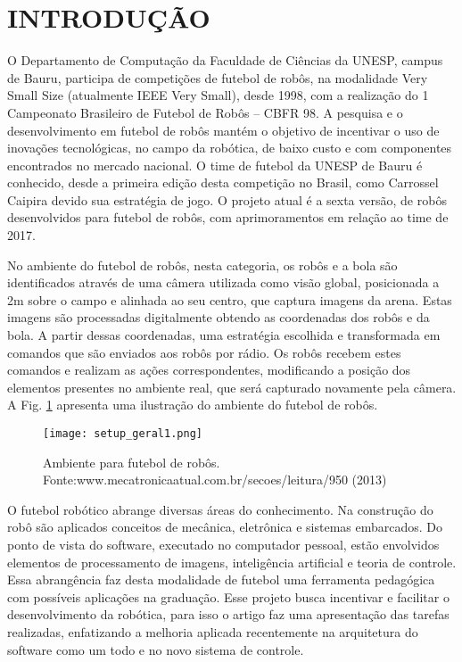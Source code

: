  \section{INTRODU{\c C}ÃO}

O Departamento de Computação da Faculdade de Ciências
da UNESP, campus de Bauru, participa de competições de
futebol de robôs, na modalidade Very Small Size (atualmente
IEEE Very Small), desde 1998, com a realização do 1\textordmasculine
Campeonato Brasileiro de Futebol de Robôs -- CBFR 98. A
pesquisa e o desenvolvimento em futebol de robôs mantém o objetivo de incentivar o uso de
inovações tecnológicas, no campo da robótica, de baixo custo e
com componentes encontrados no mercado nacional. O time de futebol da UNESP
de Bauru é conhecido, desde a primeira edição desta
competição no Brasil, como Carrossel Caipira devido sua
estratégia de jogo. O projeto atual é a sexta versão, de robôs
desenvolvidos para futebol de robôs, com aprimoramentos em
relação ao time de 2017.

No ambiente do futebol de robôs, nesta categoria, os robôs
e a bola são identificados através de uma câmera utilizada
como visão global, posicionada a 2m sobre o campo e alinhada
ao seu centro, que captura imagens da arena. Estas imagens são
processadas digitalmente obtendo as coordenadas dos robôs e da bola.
A partir dessas coordenadas, uma estratégia escolhida e transformada em comandos que são enviados aos
robôs por rádio. Os robôs recebem estes comandos e realizam
as ações correspondentes, modificando a posição dos
elementos presentes no ambiente real, que será capturado
novamente pela câmera. A Fig. \ref{fig:setup_geral} apresenta uma ilustração do
ambiente do futebol de robôs.

\begin{figure}[!htb]
\centering
\texttt{[image: setup\_geral1.png]}
\caption{Ambiente para futebol de robôs. Fonte:www.mecatronicaatual.com.br/secoes/leitura/950 (2013)}
\label{fig:setup_geral}
\end{figure}

O futebol robótico abrange diversas áreas do conhecimento.
Na construção do robô são aplicados conceitos de mecânica,
eletrônica e sistemas embarcados. Do ponto de vista do
software, executado no computador pessoal, estão envolvidos
elementos de processamento de imagens, inteligência artificial
e teoria de controle. Essa abrangência faz desta modalidade de
futebol uma ferramenta pedagógica com possíveis aplicações
na graduação.
Esse projeto busca incentivar e facilitar o desenvolvimento
da robótica, para isso o artigo faz uma apresentação das tarefas
realizadas, enfatizando a melhoria aplicada recentemente na arquitetura do software
como um todo e no novo sistema de controle.
